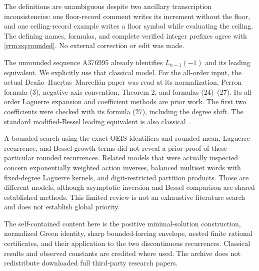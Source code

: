 \documentclass[11pt]{article}
\theoremstyle{remark}\newtheorem{remark}[theorem]{Remark}
\begin{document}
The definitions are unambiguous despite two ancillary transcription inconsistencies: one floor-record comment writes its increment without the floor, and one ceiling-record example writes a floor symbol while evaluating the ceiling. The defining names, formulas, and complete verified integer prefixes agree with \eqref{rrm:eq:rounded}. No external correction or edit was made.

The unrounded sequence A376995 already identifies $L_{n-1}(-1)$ and its leading equivalent. We explicitly use that classical model. For the all-order input, the actual Dea\~no--Huertas--Marcell\'an paper was read at its normalization, Perron formula (3), negative-axis convention, Theorem 2, and formulas (24)--(27). Its all-order Laguerre expansion and coefficient methods are prior work. The first two coefficients were checked with its formula (27), including the degree shift. The standard modified-Bessel leading equivalent is also classical \cite{dlmf}.

A bounded search using the exact OEIS identifiers and rounded-mean, Laguerre-recurrence, and Bessel-growth terms did not reveal a prior proof of these particular rounded recurrences. Related models that were actually inspected concern exponentially weighted action inverses, balanced multiset words with fixed-degree Laguerre kernels, and digit-restricted partition products. Those are different models, although asymptotic inversion and Bessel comparison are shared established methods. This limited review is not an exhaustive literature search and does not establish global priority.

The self-contained content here is the positive minimal-solution construction, normalized Green identity, sharp bounded-forcing envelope, nested finite rational certificates, and their application to the two discontinuous recurrences. Classical results and observed constants are credited where used. The archive does not redistribute downloaded full third-party research papers.
\end{document}
